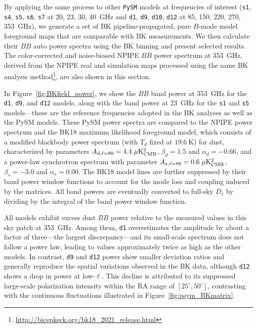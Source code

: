 \documentclass[twocolumn]{aastex631}
\begin{document}
By applying the same process to other \texttt{PySM} models at frequencies of interest (\texttt{s1}, \texttt{s4}, \texttt{s5}, \texttt{s6}, \texttt{s7} at 20, 23, 30, 40~GHz and \texttt{d1}, \texttt{d9}, \texttt{d10}, \texttt{d12} at 85, 150, 220, 270, 353~GHz), we generate a set of BK pipeline-propagated, pure $B$-mode model foreground maps that are comparable with BK measurements. We then calculate their $BB$ auto power spectra using the BK binning and present selected results. The color-corrected and noise-biased NPIPE $BB$ power spectrum at 353~GHz, derived from the NPIPE real and simulation maps processed using the same BK analysis method\footnote{\url{http://bicepkeck.org/bk18_2021_release.html}}, are also shown in this section. 

In Figure~\ref{fig:BKfield_power}, we show the $BB$ band power at 353~GHz for the \texttt{d1}, \texttt{d9}, and \texttt{d12} models, along with the band power at 23~GHz for the \texttt{s1} and \texttt{s5} models---these are the reference frequencies adopted in the BK analyses as well as the PySM models. These PySM power spectra are compared to the NPIPE power spectrum and the BK18 maximum likelihood foreground model, which consists of a modified blackbody power spectrum (with $T_d$ fixed at $19.6~\text{K}$) for dust, characterized by parameters $A_{d,\ell=80} = 4.4 \; \mu\rm{K^2_{CMB}}$, $\beta_d = 1.5$ and $\alpha_d = -0.66$, and a power-law synchrotron spectrum with parameter $A_{s,\ell=80} = 0.6 \; \mu\rm{K^2_{CMB}}$, $\beta_s = -3.0$ and $\alpha_s = 0.00$. The BK18 model lines are further suppressed by their band power window functions to account for the mode loss and coupling induced by the matrices. All band powers are eventually converted to full-sky $D_\ell$ by dividing by the integral of the band power window function.

All models exhibit excess dust $BB$ power relative to the measured values in this sky patch at 353~GHz. Among them, \texttt{d1} overestimates the amplitude by about a factor of three---the largest discrepancy---and its small-scale spectrum does not follow a power law, leading to values approximately twice as high as the other models. In contrast, \texttt{d9} and \texttt{d12} power show smaller deviation ratios and generally reproduce the spatial variations observed in the BK data, although \texttt{d12} shows a drop in power at low-$\ell$. This decline is attributed to its suppressed large-scale polarization intensity within the RA range of $[25^{\circ}, 50^{\circ}]$, contrasting with the continuous fluctuations illustrated in Figure~\ref{fig:psym_BKmatrix}.
\end{document}
